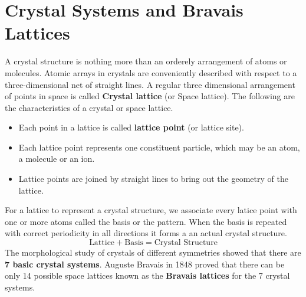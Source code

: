 \section {Crystal Systems and Bravais Lattices}
 A crystal structure is nothing more than an orderely arrangement of atoms or molecules. Atomic arrays in crystals are conveniently described with respect to a three-dimensional net of straight lines. A regular three dimensional arrangement of points in space is called \textbf{{Crystal lattice}} (or Space lattice). The following are the characteristics of a crystal or space lattice. 
\begin{itemize}
	\item 	Each point in a lattice is called  \textbf{lattice point} (or lattice site).
	\item 	Each lattice point represents one constituent particle, which may be an atom, a molecule or an ion.
	\item 	Lattice points are joined by straight lines to bring out the geometry of the lattice.
\end{itemize}
For a lattice to represent a crystal structure, we associate every latice point with one or more atoms called the basis or the pattern. When the basis is repeated with correct periodicity in all directions it forms a an actual crystal structure.
$$\text{Lattice}+\text{Basis}=\text{Crystal Structure} $$
The morphological study of crystals of different symmetries showed that there are  \textbf{{7 basic crystal systems}}.
\newline Auguste Bravais in 1848 proved that there can be only 14 possible space lattices known as the \textbf{{Bravais lattices}} for the 7 crystal systems. 
